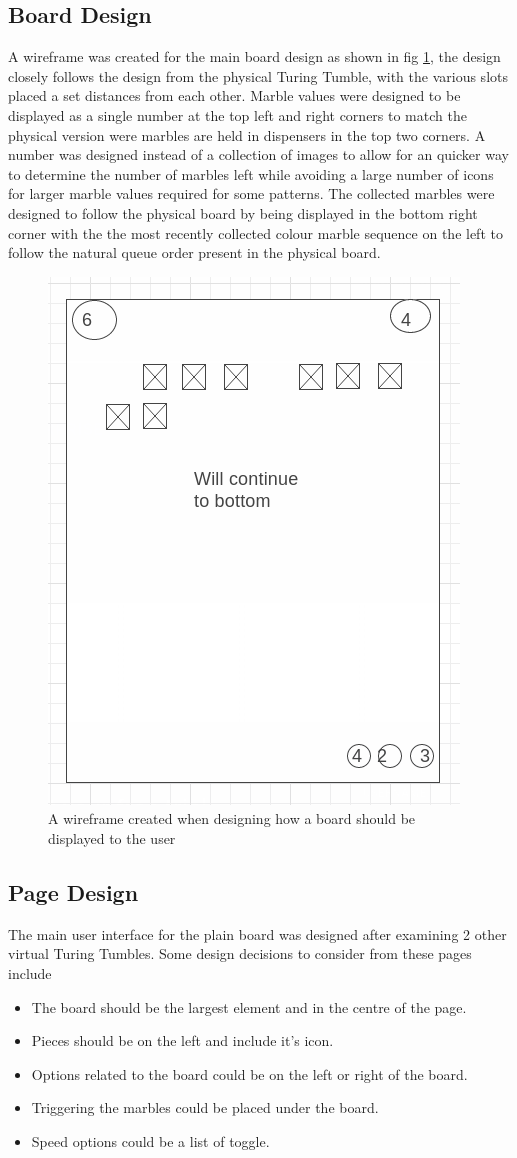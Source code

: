 \documentclass{l4proj}
\begin{document}
\subsection{Board Design}
A wireframe was created for the main board design as shown in fig \ref{fig:boardWireframe}, the design closely follows the design from the physical Turing Tumble, with the various slots placed a set distances from each other. Marble values were designed to be displayed as a single number at the top left and right corners to match the physical version were marbles are held in dispensers in the top two corners. A number was designed instead of a collection of images to allow for an quicker way to determine the number of marbles left while avoiding a large number of icons for larger marble values required for some patterns. The collected marbles were designed to follow the physical board by being displayed in the bottom right corner with the the most recently collected colour marble sequence on the left to follow the natural queue order present in the physical board.

\begin{figure}
    \centering
    \includegraphics[width=0.5\linewidth]{images/boardWireframe.png}
    \caption{A wireframe created when designing how a board should be displayed to the user}
    \label{fig:boardWireframe}
\end{figure}

\subsection{Page Design}
The main user interface for the plain board was designed after examining 2 other virtual Turing Tumbles. Some design decisions to consider from these pages include
\begin{itemize}
    \item The board should be the largest element and in the centre of the page.
    \item Pieces should be on the left and include it's icon.
    \item Options related to the board could be on the left or right of the board.
    \item Triggering the marbles could be placed under the board.
    \item Speed options could be a list of toggle.
\end{itemize}
\end{document}
